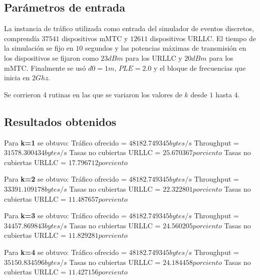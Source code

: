 \subsection{Parámetros de entrada}

La instancia de tráfico utilizada como entrada del simulador de eventos discretos, comprendía $37541$ dispositivos mMTC y $12611$ dispositivos URLLC. El tiempo de la simulación se fijo en $10$ segundos y las potencias máximas de transmisión en los dispositivos se fijaron como $23dBm$ para los URLLC y $20dBm$ para los mMTC. Finalmente se usó $d0=1m$, $PLE=2.0$ y el bloque de frecuencias que inicia en $2Ghz$. 

Se corrieron 4 rutinas en las que se variaron los valores de $k$ desde $1$ hasta $4$.

\subsection{Resultados obtenidos}

Para \textbf{k=1} se obtuvo:\newline
Tráfico ofrecido = $48182.749345 bytes/s$ \newline
Throughput = $31578.300434 bytes/s$ \newline
Tasas no cubiertas URLLC = $25.670367 porciento$ \newline
Tasas no cubiertas URLLC = $17.796712 porciento$ \newline

Para \textbf{k=2} se obtuvo:\newline
Tráfico ofrecido = $48182.749345 bytes/s$ \newline
Throughput = $33391.109178 bytes/s$ \newline
Tasas no cubiertas URLLC = $22.322801 porciento$ \newline
Tasas no cubiertas URLLC = $11.487657 porciento$ \newline

Para \textbf{k=3} se obtuvo:\newline
Tráfico ofrecido = $48182.749345 bytes/s$ \newline
Throughput = $34457.869843 bytes/s$ \newline
Tasas no cubiertas URLLC = $24.560205 porciento$ \newline
Tasas no cubiertas URLLC = $11.829281 porciento$ \newline

Para \textbf{k=4} se obtuvo:\newline
Tráfico ofrecido = $48182.749345 bytes/s$ \newline
Throughput = $35150.834596 bytes/s$ \newline
Tasas no cubiertas URLLC = $24.184458 porciento$ \newline
Tasas no cubiertas URLLC = $11.427156 porciento$ \newline
